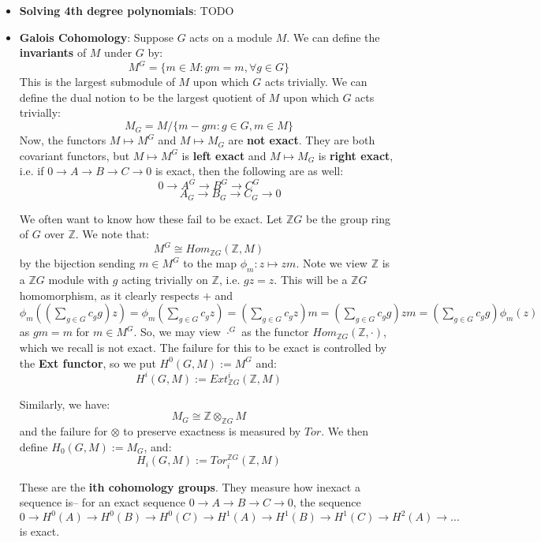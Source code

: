 \documentclass[11pt, oneside]{amsart}   	%
\theoremstyle{definition}
\begin{document}
\begin{itemize}
	\item \textbf{Solving 4th degree polynomials}: TODO 
	
	\item \textbf{Galois Cohomology}: Suppose $G$ acts on a module $M$. We can define the \textbf{invariants} of $M$ under $G$ by:
	$$
		M^G = \{m\in M : gm = m, \forall g\in G\}
	$$
	This is the largest submodule of $M$ upon which $G$ acts trivially. We can define the dual notion to be the largest quotient of $M$ upon which $G$ 
	acts trivially:
	$$
		M_G = M / \{m - gm : g\in G, m\in M\}
	$$
	Now, the functors $M\mapsto M^G$ and $M\mapsto M_G$ are \textbf{not exact}. They are both covariant functors, but $M\mapsto M^G$ is \textbf{left 
	exact} and $M\mapsto M_G$ is \textbf{right exact}, i.e. if $0\rightarrow A\rightarrow B\rightarrow C\rightarrow 0$ is exact, then the following are as well:
	$$
		0\rightarrow A^G\rightarrow B^G\rightarrow C^G
	$$
	$$
		\;\;\;\;\;\;\;\;\;\;\;\;\;\;A_G\rightarrow B_G\rightarrow C_G\rightarrow 0
	$$
	
	We often want to know how these fail to be exact. Let $\mathbb Z G$ be the group ring of $G$ over $\mathbb Z$. We note that:
	$$
		M^G \cong Hom_{\mathbb Z G}(\mathbb Z, M)
	$$
	by the bijection sending $m\in M^G$ to the map $\phi_m : z\mapsto zm$. Note we view $\mathbb Z$ is a $\mathbb ZG$ module with $g$ acting trivially 
	on $\mathbb Z$, i.e. $gz = z$. This will be a $\mathbb ZG$ homomorphism, as it clearly respects $+$ and $\phi_m((\sum_{g\in G} c_gg)z) = \phi_m
	(\sum_{g\in G}c_gz) = (\sum_{g\in G}c_gz)m = (\sum_{g\in G}c_gg)zm = (\sum_{g\in G}c_gg)\phi_m(z)$ as $gm = m$ for $m\in M^G$. So, we may 
	view $\cdot^G$ as the functor $Hom_{\mathbb ZG}(\mathbb Z, \cdot)$, which we recall is not exact. The failure for this to be exact is controlled by the 
	\textbf{Ext functor}, so we put $H^0(G, M) := M^G$ and:
	$$
		H^i(G, M) := Ext_{\mathbb ZG}^i(\mathbb Z, M)
	$$
	
	Similarly, we have:
	$$
		M_G\cong \mathbb Z\otimes_{\mathbb ZG} M
	$$
	and the failure for $\otimes$ to preserve exactness is measured by $Tor$. We then define $H_0(G, M) := M_G$, and:
	$$
		H_i(G, M) := Tor_i^{\mathbb ZG}(\mathbb Z, M)
	$$
	
	These are the \textbf{ith cohomology groups}. They measure how inexact a sequence is-- for an exact sequence $0\rightarrow A\rightarrow B 
	\rightarrow C \rightarrow 0$, the sequence $0\rightarrow H^0(A)\rightarrow H^0(B)\rightarrow H^0(C)\rightarrow H^1(A)\rightarrow H^1(B)\rightarrow 
	H^1(C)\rightarrow H^2(A)\rightarrow...$ is exact.

\end{itemize}
\end{document}
